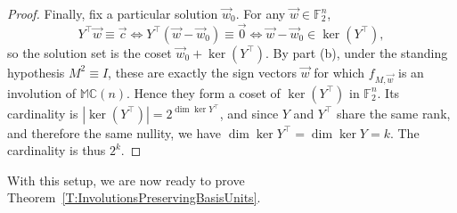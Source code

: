 \documentclass[12pt]{amsart}
\theoremstyle{plain}
\theoremstyle{definition}
\numberwithin{equation}{section}
\newcommand{\mC}{\mathbb{C}}
\newcommand{\mM}{\mathbb{M}}
\begin{document}
\begin{proof}
Finally, fix a particular solution $\vec w_0$. For any $\vec w \in \mathbb F_2^n$,
\[
Y^{\top} \vec w \equiv \vec c
\iff Y^{\top}(\vec w - \vec w_0) \equiv \vec 0
\iff \vec w - \vec w_0 \in \ker(Y^{\top}),
\]
so the solution set is the coset $\vec w_0 + \ker(Y^{\top})$. By part (b), under the
standing hypothesis $M^2 \equiv I$, these are exactly the sign vectors $\vec w$ for which
$f_{M, \vec w}$ is an involution of $\mM \mC(n)$. Hence they form a coset of
$\ker(Y^{\top})$ in $\mathbb F_2^n$. Its cardinality is $|\ker(Y^{\top})| = 2^{\dim \ker
Y^{\top}}$, and since $Y$ and $Y^{\top}$ share the same rank, and therefore the same
nullity, we have $\dim \ker Y^{\top} = \dim \ker Y = k$. The cardinality is thus $2^k$. 
    \end{proof}

With this setup, we are now ready to prove Theorem~\ref{T:InvolutionsPreservingBasisUnits}.
\end{document}
